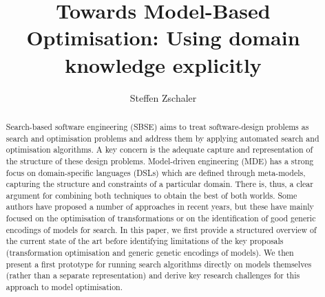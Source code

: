 \documentclass[draft]{llncs}
\title{Towards Model-Based Optimisation: Using domain knowledge explicitly}
\author{Steffen Zschaler\inst{1}}
\institute{
	Department of Informatics\\
	King's College London\\
	\email{szschaler@acm.org}
}
\begin{document}
	\maketitle
	
	\begin{abstract}
		Search-based software engineering (SBSE) aims to treat soft\-ware-design problems as search and optimisation problems and address them by applying automated
		search and optimisation algorithms. A key concern is the adequate capture and representation of the structure of these design problems. Model-driven
		engineering (MDE) has a strong focus on domain-specific languages (DSLs) which are defined through meta-models, capturing the structure and constraints of a
		particular domain. There is, thus, a clear argument for combining both techniques to obtain the best of both worlds. Some authors have proposed a number of
		approaches in recent years, but these have mainly focused on the optimisation of transformations or on the identification of good generic encodings of models
		for search.
		In this paper, we first provide a structured overview of the current state of the art before identifying limitations of the key proposals (transformation
		optimisation and generic genetic encodings of models). We then present a first prototype for running search algorithms directly on models themselves (rather
		than a separate representation) and derive key research challenges for this approach to model optimisation.
		
		\ifdraft
		\fi
		
	\end{abstract}
	
	
	
	

	
	
		
	
	
	
		
	
	
	
	
\end{document}
